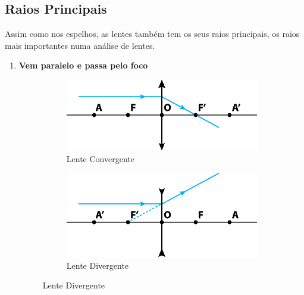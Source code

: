 \documentclass[12pt]{extarticle}
\newcommand{\<}{\langle}
\renewcommand{\>}{\rangle}
\theoremstyle{definition}
\begin{document}
\subsection{Raios Principais}
Assim como nos espelhos, as lentes também tem os seus raios principais, os raios mais importantes numa análise de lentes.
\begin{enumerate}
    \item \textbf{Vem paralelo e passa pelo foco}
    \begin{figure}[H]
        \centering
        \begin{subfigure}[b]{0.45\textwidth}
         \centering
         \includegraphics[width=\textwidth]{notaveis_conv_1.png}
         \caption{Lente Convergente}
         \label{fig:raios_conv_1}
     \end{subfigure}
     \hfill
     \begin{subfigure}[b]{0.45\textwidth}
         \centering
         \includegraphics[width=\textwidth]{notaveis_div_1.png}
         \caption{Lente Divergente}
         \label{fig:raios_div_1}
     \end{subfigure}
    \end{figure}
    

\end{enumerate}
\end{document}
